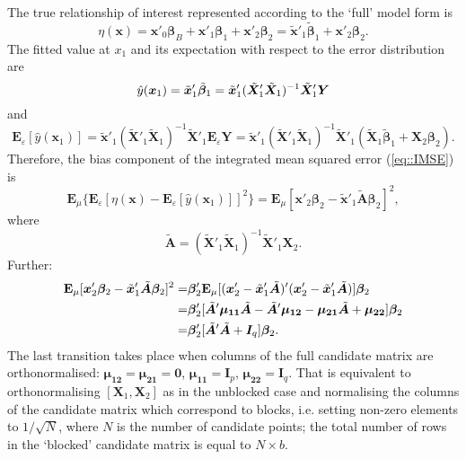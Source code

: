 The true relationship of interest represented according to the `full' model form is
\begin{equation*}
\eta(\bm{x})=\bm{x}'_0\bm{\beta}_{B}+\bm{x}'_1\bm{\beta}_{1}+\bm{x}'_2\bm{\beta}_{2}=\tilde{\bm{x}}'_1\tilde{\bm{\beta}}_{1}+\bm{x}'_2\bm{\beta}_{2}.
\end{equation*}
The fitted value at $x_{1}$ and its expectation with respect to the error distribution are 
\begin{equation*}
\hat{y}(\bm{x}_1)=\tilde{\bm{x}}'_{1}\tilde{\bm{\beta}}_{1}=\tilde{\bm{x}}'_{1}(\tilde{\bm{X}}'_{1}\tilde{\bm{X}}_{1})^{-1}\tilde{\bm{X}}'_{1}\bm{Y} \\
\end{equation*}
and
\begin{equation*}
\textbf{E}_{\varepsilon}[\hat{y}(\bm{x}_1)]=\tilde{\bm{x}}'_1(\tilde{\bm{X}}'_{1}\tilde{\bm{X}}_{1})^{-1}\tilde{\bm{X}}'_{1}\textbf{E}_{\varepsilon}\bm{Y}=\tilde{\bm{x}}'_1(\tilde{\bm{X}}'_{1}\tilde{\bm{X}}_{1})^{-1}\tilde{\bm{X}}'_{1}(\tilde{\bm{X}}_{1}\tilde{\bm{\beta}}_{1}+\bm{X}_{2}\bm{\beta}_{2}).
\end{equation*}
Therefore, the bias component of the integrated mean squared error (\ref{eq::IMSE}) is 
\begin{equation*}
\textbf{E}_{\mu}\{\textbf{E}_{\varepsilon}[\eta(\bm{x})-\textbf{E}_{\varepsilon}[\hat{y}(\bm{x}_1)]]^2\}=\textbf{E}_{\mu}[\bm{x}'_2\bm{\beta}_{2}-\tilde{\bm{x}}'_{1}\tilde{\bm{A}}\bm{\beta}_{2}]^2,
\end{equation*}
where
\begin{equation*}
\tilde{\bm{A}}=(\tilde{\bm{X}}'_{1}\tilde{\bm{X}}_{1})^{-1}\tilde{\bm{X}}'_{1}\bm{X}_{2}.
\end{equation*}
Further:
\begin{align}
\label{eq::blocks_bias}
\textbf{E}_{\mu}[\bm{x}'_2\bm{\beta}_{2}-\tilde{\bm{x}}'_{1}\tilde{\bm{A}}\bm{\beta}_{2}]^2=&  \bm{\beta}'_{2}\textbf{E}_{\mu}[(\bm{x}'_{2}-\tilde{\bm{x}}'_{1}\tilde{\bm{A}})'(\bm{x}'_{2}-\tilde{\bm{x}}'_{1}\tilde{\bm{A}})]\bm{\beta}_{2}\notag \\=& \bm{\beta}'_{2}[\tilde{\bm{A}}'\bm{\mu_{11}}\tilde{\bm{A}}-\tilde{\bm{A}}'\bm{\mu_{12}}-\bm{\mu_{21}}\tilde{\bm{A}}+\bm{\mu_{22}}]\bm{\beta}_{2}\notag\\=& \bm{\beta}'_{2}[\tilde{\bm{A}}'\tilde{\bm{A}}+\bm{I}_{q}]\bm{\beta}_{2}.
\end{align}
The last transition takes place when columns of the full candidate matrix are orthonormalised: $\bm{\mu_{12}}=\bm{\mu_{21}}=\bm{0}$, $\bm{\mu_{11}}=\bm{I}_{p}$, $\bm{\mu_{22}}=\bm{I}_{q}$. That is equivalent to orthonormalising $[\bm{X}_{1},\bm{X}_{2}]$ as in the unblocked case and normalising the columns of the candidate matrix which correspond to blocks, i.e. setting non-zero elements to $1/\sqrt{N}$, where $N$ is the number of candidate points; the total number of rows in the `blocked' candidate matrix is equal to $N	\times b$.

